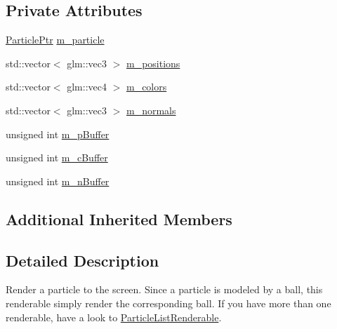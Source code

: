 \subsection*{Private Attributes}
\begin{DoxyCompactItemize}
\item 
\hyperlink{Particle_8hpp_a9a7abc8635002993537b61ef2c857fdd}{Particle\+Ptr} \hyperlink{classParticleRenderable_a40dd90b39f07278bfc9e5b9017c08592}{m\+\_\+particle}
\item 
std\+::vector$<$ glm\+::vec3 $>$ \hyperlink{classParticleRenderable_ae471301b0257ebc014ed7dabf16ebd16}{m\+\_\+positions}
\item 
std\+::vector$<$ glm\+::vec4 $>$ \hyperlink{classParticleRenderable_a8eb17ca66cfe99d7d23fe054d1ba14d5}{m\+\_\+colors}
\item 
std\+::vector$<$ glm\+::vec3 $>$ \hyperlink{classParticleRenderable_a816b9593b39a4f21d837bd0fbebd393e}{m\+\_\+normals}
\item 
unsigned int \hyperlink{classParticleRenderable_a42d3e2dc47524177be00fbc7ee1a244b}{m\+\_\+p\+Buffer}
\item 
unsigned int \hyperlink{classParticleRenderable_abe8e83a99746edd15b7611b8073c6ea9}{m\+\_\+c\+Buffer}
\item 
unsigned int \hyperlink{classParticleRenderable_adc8135a6d1f34037dcf942cf10cb296b}{m\+\_\+n\+Buffer}
\end{DoxyCompactItemize}
\subsection*{Additional Inherited Members}


\subsection{Detailed Description}
Render a particle to the screen. Since a particle is modeled by a ball, this renderable simply render the corresponding ball. If you have more than one renderable, have a look to \hyperlink{classParticleListRenderable}{Particle\+List\+Renderable}. 

